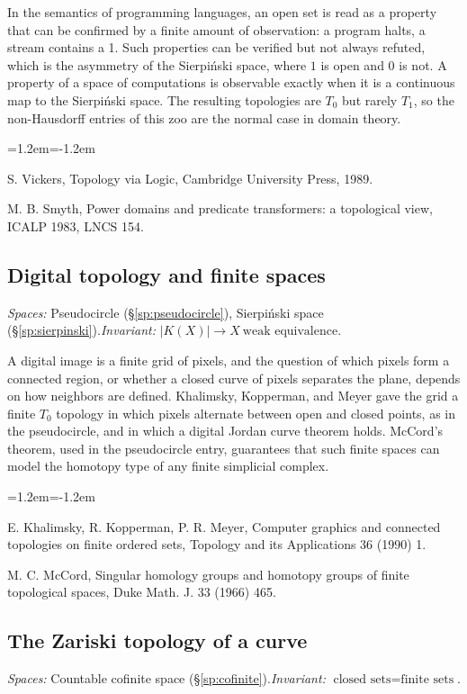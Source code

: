\documentclass[11pt,twoside]{book}
\begin{document}
In the semantics of programming languages, an open set is read as a property that can be confirmed by a finite amount of observation: a program halts, a stream contains a 1. Such properties can be verified but not always refuted, which is the asymmetry of the Sierpiński space, where $1$ is open and $0$ is not. A property of a space of computations is observable exactly when it is a continuous map to the Sierpiński space. The resulting topologies are $T_0$ but rarely $T_1$, so the non-Hausdorff entries of this zoo are the normal case in domain theory.
\begin{list}{}{\leftmargin=1.2em\itemindent=-1.2em\itemsep=0pt}\small \item S. Vickers, Topology via Logic, Cambridge University Press, 1989.\item M. B. Smyth, Power domains and predicate transformers: a topological view, ICALP 1983, LNCS 154.\end{list}
\subsection{Digital topology and finite spaces}\label{app:app-digital}
\noindent\textit{Spaces:} Pseudocircle (\S\ref{sp:pseudocircle}), Sierpiński space (\S\ref{sp:sierpinski}).\enspace\textit{Invariant:} $|K(X)|\to X\ \text{weak equivalence}$.

A digital image is a finite grid of pixels, and the question of which pixels form a connected region, or whether a closed curve of pixels separates the plane, depends on how neighbors are defined. Khalimsky, Kopperman, and Meyer gave the grid a finite $T_0$ topology in which pixels alternate between open and closed points, as in the pseudocircle, and in which a digital Jordan curve theorem holds. McCord's theorem, used in the pseudocircle entry, guarantees that such finite spaces can model the homotopy type of any finite simplicial complex.
\begin{list}{}{\leftmargin=1.2em\itemindent=-1.2em\itemsep=0pt}\small \item E. Khalimsky, R. Kopperman, P. R. Meyer, Computer graphics and connected topologies on finite ordered sets, Topology and its Applications 36 (1990) 1.\item M. C. McCord, Singular homology groups and homotopy groups of finite topological spaces, Duke Math. J. 33 (1966) 465.\end{list}
\subsection{The Zariski topology of a curve}\label{app:app-zariski}
\noindent\textit{Spaces:} Countable cofinite space (\S\ref{sp:cofinite}).\enspace\textit{Invariant:} $\text{closed sets}=\text{finite sets}$.
\end{document}
